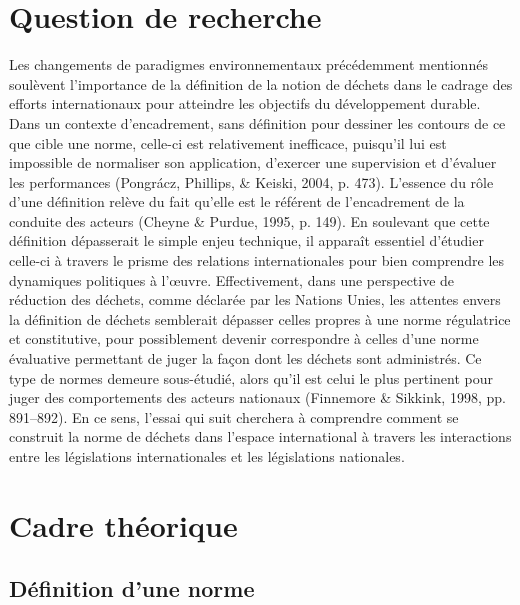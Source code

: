 \documentclass[12pt]{ulaval}
\begin{document}
\section{Question de recherche}\label{question-de-recherche}

Les changements de paradigmes environnementaux précédemment mentionnés soulèvent l'importance de la définition de la notion de déchets dans le cadrage des efforts internationaux pour atteindre les objectifs du développement durable. Dans un contexte d'encadrement, sans définition pour dessiner les contours de ce que cible une norme, celle-ci est relativement inefficace, puisqu'il lui est impossible de normaliser son application, d'exercer une supervision et d'évaluer les performances (Pongrácz, Phillips, \& Keiski, 2004, p. 473). L'essence du rôle d'une définition relève du fait qu'elle est le référent de l'encadrement de la conduite des acteurs (Cheyne \& Purdue, 1995, p. 149). En soulevant que cette définition dépasserait le simple enjeu technique, il apparaît essentiel d'étudier celle-ci à travers le prisme des relations internationales pour bien comprendre les dynamiques politiques à l'œuvre. Effectivement, dans une perspective de réduction des déchets, comme déclarée par les Nations Unies, les attentes envers la définition de déchets semblerait dépasser celles propres à une norme régulatrice et constitutive, pour possiblement devenir correspondre à celles d'une norme évaluative permettant de juger la façon dont les déchets sont administrés. Ce type de normes demeure sous-étudié, alors qu'il est celui le plus pertinent pour juger des comportements des acteurs nationaux (Finnemore \& Sikkink, 1998, pp. 891--892). En ce sens, l'essai qui suit cherchera à comprendre comment se construit la norme de déchets dans l'espace international à travers les interactions entre les législations internationales et les législations nationales.

\section{Cadre théorique}\label{cadre-thuxe9orique}

\subsection{Définition d'une norme}\label{duxe9finition-dune-norme}
\end{document}
